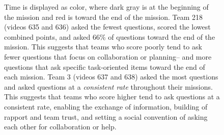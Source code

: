 \begin{figure}[h!]
    \centering
    \caption{Time is displayed as color, where dark gray is at the beginning of the mission and red is toward the end of the mission. Team 218 (videos 635 and 636) asked the
fewest questions, scored the lowest combined points, and asked 66\%
of questions toward the end of the mission. This suggests that teams who score poorly tend to ask fewer questions that focus on collaboration or planning-- and more questions that ask specific task-oriented items toward the end of each mission. Team 3 (videos 637 and 638) asked the most questions and asked questions at a \emph{consistent rate} throughout their missions. This suggests that teams who score higher tend to ask questions at a consistent rate, enabling the exchange of information, building of rapport and team trust, and setting a social convention of asking each other for collaboration or help. }
\end{figure}


